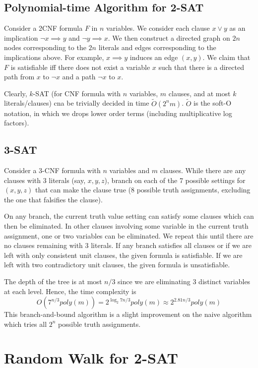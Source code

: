 \subsection{Polynomial-time Algorithm for 2-SAT}

Consider a 2CNF formula $F$ in $n$ variables. We consider each clause $x \lor y$ as an implication $\neg x \implies y$ and $\neg y \implies x$. We then construct a directed graph on $2n$ nodes corresponding to the $2n$ literals and edges corresponding to the implications above. For example, $x \implies y$ induces an edge $(x,y)$. We claim that $F$ is satisfiable iff there does not exist a variable $x$ such that there is a directed path from $x$ to $\neg x$ and a path $\neg x$ to $x$.

Clearly, $k$-SAT (for CNF formula with $n$ variables, $m$ clauses, and at most $k$ literals/clauses) cna be trivially decided in time $\widetilde{O}(2^n m)$. $\widetilde{O}$ is the soft-O notation, in which we drops lower order terms (including multiplicative log factors).

\subsection{3-SAT}

Consider a 3-CNF formula with $n$ variables and $m$ clauses. While there are any clauses with 3 literals (say, $x,y,z$), branch on each of the 7 possible settings for $(x,y,z)$ that can make the clause true (8 possible truth assignments, excluding the one that falsifies the clause).

On any branch, the current truth value setting can satisfy some clauses which can then be eliminated. In other clauses involving some variable in the current truth assignment, one or two variables can be eliminated. We repeat this until there are no clauses remaining with 3 literals. If any branch satisfies all clauses or if we are left with only consistent unit clauses, the given formula is satisfiable. If we are left with two contradictory unit clauses, the given formula is unsatisfiable.

The depth of the tree is at most $n / 3$ since we are eliminating 3 distinct variables at each level. Hence, the time complexity is
$$
O(7^{n/3} \mathit{poly}(m)) = 2^{\log_2 7n / 3} \mathit{poly}(m) \approx 2^{2.81n / 3} \mathit{poly}(m)
$$
This branch-and-bound algorithm is a slight improvement on the naive algorithm which tries all $2^n$ possible truth assignments.

\section{Random Walk for 2-SAT}


